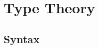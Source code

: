 \documentclass[acmsmall,screen,review]{acmart}
\newcommand{\ms}[1]{\ensuremath{\mathsf{#1}}}
\newcommand{\letexpr}[3]{\ensuremath{\ms{let}\;#1 = #2;\;#3}}
\newcommand{\teqv}{\approx}
\newcommand{\tref}{\twoheadrightarrow}
\begin{document}



\section{Type Theory}


\subsection{Syntax}
\end{document}
